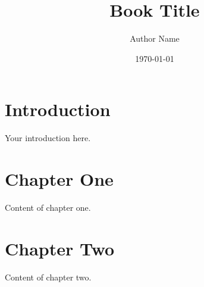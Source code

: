 \documentclass[12pt]{book}
\title{Book Title}
\author{Author Name}
\date{\today}
\begin{document}
\frontmatter
\maketitle
\tableofcontents

\mainmatter

\chapter{Introduction}
Your introduction here.

\chapter{Chapter One}
Content of chapter one.

\chapter{Chapter Two}
Content of chapter two.

\backmatter
\end{document}
